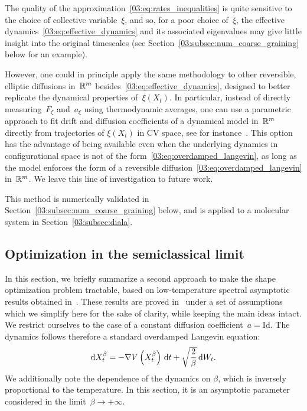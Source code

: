     \begin{remark}
        \label{03:rem:other_eff_diffusion}
        The quality of the approximation~\eqref{03:eq:rates_inequalities} is quite sensitive to the choice of collective variable~$\xi$,
        and so, for a poor choice of~$\xi$, the effective dynamics~\eqref{03:eq:effective_dynamics} and its associated eigenvalues may give little insight into the original timescales (see Section~\ref{03:subsec:num_coarse_graining} below for an example).

        However, one could in principle apply the same methodology to other reversible, elliptic diffusions in~$\mathbb{R}^m$ besides~\eqref{03:eq:effective_dynamics}, designed to better replicate the dynamical properties of~$\xi(X_t)$.
        In particular, instead of directly measuring~$F_\xi$ and~$a_\xi$ using thermodynamic averages, one can use a parametric approach to fit drift and diffusion coefficients of a dynamical model in~$\mathbb{R}^m$ directly from trajectories of $\xi(X_t)$ in CV space, see for instance~\cite{KPPK15}.
        This option has the advantage of being available even when the underlying dynamics in configurational space is not of the form~\eqref{03:eq:overdamped_langevin}, as long as the model enforces the form of a reversible diffusion~\eqref{03:eq:overdamped_langevin} in~$\mathbb{R}^m$.
        We leave this line of investigation to future work.
    \end{remark}
    This method is numerically validated in Section~\ref{03:subsec:num_coarse_graining} below, and is applied to a molecular system in Section~\ref{03:subsec:diala}.
    
    \subsection{Optimization in the semiclassical limit}
        \label{03:sec:semiclassic}
    In this section, we briefly summarize a second approach to make the shape optimization problem tractable, based on low-temperature spectral asymptotic results obtained in~\cite[Section 2.5]{BLS25a}.
    These results are proved in~\cite{BLS25a} under a set of assumptions which we simplify here for the sake of clarity, while keeping the main ideas intact.
    We restrict ourselves to the case of a constant diffusion coefficient~$a = \mathrm{Id}$. The dynamics follows therefore a standard overdamped Langevin equation:
    \begin{equation}
        \label{03:eq:overdamped_langevin_sc}
        \mathrm{d} X_t^\beta = -\nabla V\left(X_t^\beta\right)\,\mathrm{d} t + \sqrt{\frac{2}{\beta}}\,\mathrm{d} W_t.
    \end{equation}
    We additionally note the dependence of the dynamics on $\beta$, which is inversely proportional to the temperature. In this section, it is an asymptotic parameter considered in the limit~$\beta\to+\infty$.

